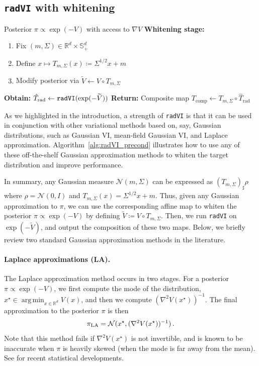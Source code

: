 \documentclass[twoside]{article}
\newcommand{\cN}{\mathcal{N}}
\newcommand{\1}{\mathds{1}}
\newcommand{\R}{\mathbb{R}}
\newcommand*{\defeq}{\coloneqq}
\DeclareMathOperator*{\argmin}{arg\,min}
\theoremstyle{plain}
\theoremstyle{definition}
\theoremstyle{remark}
\renewcommand{\tilde}{\widetilde}
\begin{document}
\subsection{\texttt{radVI} with whitening}\label{ssec:whiten}
\begin{algorithm}[t]
\caption{ \texttt{radVI} with whitening}\label{alg:radVI_precond}
\begin{algorithmic}
 Posterior $\pi \propto \exp(-V)$ with access to $\nabla V$
\State\textbf{Whitening stage:}

\begin{enumerate}
    \item Fix $(m,\Sigma) \in \R^d \times \mathbb{S}^d_{+}$ 
    \item Define
    $x \mapsto T_{m,\Sigma}(x) \defeq \Sigma^{1/2}x + m$
    \item Modify posterior via 
    $\tilde{V} \gets V \circ T_{m,\Sigma}$
\end{enumerate}

\State\textbf{Obtain:} $\hat T_{\rm rad} \gets \texttt{radVI}(\exp(-\tilde V))$
\State\textbf{Return:} Composite map 
       $T_{\mathrm{comp}} \gets T_{m,\Sigma} \circ \hat{T}_{\mathrm{rad}}$
\end{algorithmic}
\end{algorithm}
As we highlighted in the introduction, a strength of \texttt{radVI} is that it can be used in conjunction with other variational methods based on, say, Gaussian distributions, such as Gaussian VI, mean-field Gaussian VI, and Laplace approximation. Algorithm~\ref{alg:radVI_precond} illustrates how to use any of these off-the-shelf Gaussian approximation methods to whiten the target distribution and improve performance. 

In summary, any Gaussian measure $\cN(m,\Sigma)$ can be expressed as $(T_{m,\Sigma})_\sharp\rho$ where $\rho = \cN(0,I)$ and $T_{m,\Sigma}(x) = \Sigma^{1/2}x + m$. Thus, given any Gaussian approximation to $\pi$, we can use the corresponding affine map to whiten the posterior $\pi\propto\exp(-V)$ by defining $\tilde{V} \defeq V\circ T_{m,\Sigma}$.
Then, we run \texttt{radVI} on $\exp(-\tilde{V})$, and output the composition of these two maps. Below, we briefly review two standard Gaussian approximation methods in the literature.
\vspace{-6mm}
\paragraph{Laplace approximations (LA).}
The Laplace approximation method occurs in two stages. For a posterior $\pi \propto \exp(-V)$, we first compute the mode of the distribution, $x^\star \in \argmin_{x \in \R^d} V(x)$,
and then we compute $(\nabla^2 V(x^\star))^{-1}$. The final approximation to the posterior $\pi$ is then
\begin{align}\label{eq:pi_la}
    \pi_{\rm LA} = \cN(x^\star, (\nabla^2 V(x^\star))^{-1})\,.
\end{align}
Note that this method fails if $\nabla^2 V(x^\star)$ is not invertible, and is known to be inaccurate when $\pi$ is heavily skewed (when the mode is far away from the mean). See \cite{katsevich2023laplace,katsevich2024laplace} for recent statistical developments.
\end{document}
